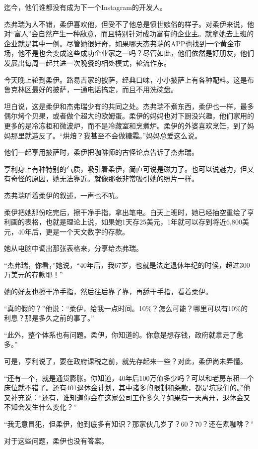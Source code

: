 迄今，他们谁都没有成为下一个Instagram的开发人。

杰弗瑞为人不错，柔伊喜欢他，但受不了他总是愤世嫉俗的样子。对柔伊来说，他对“富人”会自然产生一种敌意，而且特别针对成功富有的企业主。就拿她去上班的企业就是其中一例。尽管她很好奇，如果哪天杰弗瑞的APP也找到一个黄金市场，他不是也会变成这些成功企业家之一吗？尽管如此，他们依然是好朋友，他们发展出每周一起共进一次晚餐的相处模式，轮流作东。

今天晚上轮到柔伊。路易吉家的披萨，经典口味，小小披萨上有各种配料。这是布鲁克林区最好的披萨，一通电话搞定，而且不用洗碗盘。

坦白说，这是柔伊和杰弗瑞少有的共同之处。杰弗瑞不煮东西，柔伊也一样，最多偶尔烤个贝果，或者做个超大的欧姆蛋。柔伊的妈妈也对下厨没兴趣，他们家用的更多的是冷冻柜和微波炉，而不是冷藏室和烹煮炉。柔伊的外婆喜欢烹饪，到了妈妈那里就造反了。“烘焙？我甚至不会做糖霜。”妈妈总爱这么说。

他们一起享用披萨时，柔伊把咖啡师的古怪论点告诉了杰弗瑞。

亨利身上有种特别的气质，吸引着柔伊，简直可说是磁力了。也可以说魅力，但又有奇怪的原因，她无法靠近。就像那张非常吸引她的照片一样。

杰弗瑞听着柔伊的叙述，一声也不吭。

柔伊把她那份吃完后，擦干净手指，拿出笔电。白天上班时，她已经抽空重绘了亨利画的表格，也就是理论上说，如果她1天存25美元，1年就可以存到将近6,800美元，40年后，更是一个天文数字的存款。

她从电脑中调出那张表格来，分享给杰弗瑞。

“杰弗瑞，你看，”她说，“40年后，我67岁，也就是法定退休年纪的时候，超过300万美元的存款耶！”

她的好友也擦干净手指，然后往后靠了靠，再舔干手指，看着柔伊。

“真的假的？”他说：“柔伊，给我一点时间。10\%？怎么可能？哪里可以有10\%的利息？那是多久之前的事了。”

“此外，整个体系也有问题。柔伊，你知道的。你愈是想存钱，政府就拿走了愈多。”

可是，亨利说了，要在政府课税之前，就先存起来一些？对此，柔伊尚未弄懂。

“还有一个，就是通货膨胀。你知道，40年后100万值多少吗？可以和老房东租一个床位就不错了。还有401退休金计划，其中诸多的限制和条款，都是坑我们的。”他又补充说：“还有，谁知道你会在这家公司工作多久？如果有一天离开，退休金又不知会发生什么变化？”

“我无意冒犯，但柔伊，他到底多有知识？那家伙几岁了？60？70？还在煮咖啡？”

对于这些问题，柔伊也没有答案。

